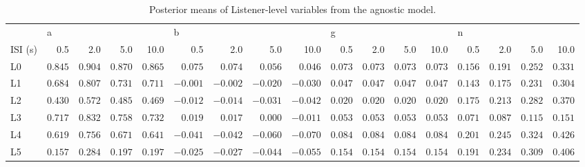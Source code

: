 \begin{table} \centering \caption{Posterior means of Listener-level variables from the agnostic model.} \label{vars} \begin{tabular}{lrrrrrrrrrrrrrrrr} \toprule {} & \multicolumn{4}{l}{a} & \multicolumn{4}{l}{b} & \multicolumn{4}{l}{g} & \multicolumn{4}{l}{n} \\ ISI (s) & 0.5 & 2.0 & 5.0 & 10.0 & 0.5 & 2.0 & 5.0 & 10.0 & 0.5 & 2.0 & 5.0 & 10.0 & 0.5 & 2.0 & 5.0 & 10.0 \\ \midrule L0 & $0.845$ & $0.904$ & $0.870$ & $0.865$ & $0.075$ & $0.074$ & $0.056$ & $0.046$ & $0.073$ & $0.073$ & $0.073$ & $0.073$ & $0.156$ & $0.191$ & $0.252$ & $0.331$ \\ L1 & $0.684$ & $0.807$ & $0.731$ & $0.711$ & $-0.001$ & $-0.002$ & $-0.020$ & $-0.030$ & $0.047$ & $0.047$ & $0.047$ & $0.047$ & $0.143$ & $0.175$ & $0.231$ & $0.304$ \\ L2 & $0.430$ & $0.572$ & $0.485$ & $0.469$ & $-0.012$ & $-0.014$ & $-0.031$ & $-0.042$ & $0.020$ & $0.020$ & $0.020$ & $0.020$ & $0.175$ & $0.213$ & $0.282$ & $0.370$ \\ L3 & $0.717$ & $0.832$ & $0.758$ & $0.732$ & $0.019$ & $0.017$ & $0.000$ & $-0.011$ & $0.053$ & $0.053$ & $0.053$ & $0.053$ & $0.071$ & $0.087$ & $0.115$ & $0.151$ \\ L4 & $0.619$ & $0.756$ & $0.671$ & $0.641$ & $-0.041$ & $-0.042$ & $-0.060$ & $-0.070$ & $0.084$ & $0.084$ & $0.084$ & $0.084$ & $0.201$ & $0.245$ & $0.324$ & $0.426$ \\ L5 & $0.157$ & $0.284$ & $0.197$ & $0.197$ & $-0.025$ & $-0.027$ & $-0.044$ & $-0.055$ & $0.154$ & $0.154$ & $0.154$ & $0.154$ & $0.191$ & $0.234$ & $0.309$ & $0.406$ \\ \bottomrule \end{tabular} \end{table}